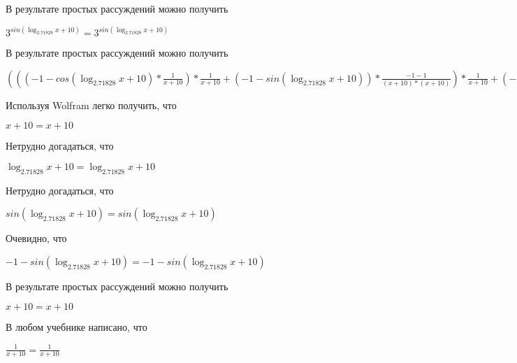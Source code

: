 \documentclass[12pt,a4paper,fleqn]{article}
\theoremstyle{definition}
\begin{document}
В результате простых рассуждений можно получить

${ 3 }^{sin(\log_{ 2.71828 }{ x  +  10 })} = { 3 }^{sin(\log_{ 2.71828 }{ x  +  10 })}$

В результате простых рассуждений можно получить

$((( -1  - cos(\log_{ 2.71828 }{ x  +  10 }) * \frac{ 1 }{ x  +  10 }
) * \frac{ 1 }{ x  +  10 }
 + ( -1  - sin(\log_{ 2.71828 }{ x  +  10 })) * \frac{ -1  -  1 }{( x  +  10 ) * ( x  +  10 )}
) * \frac{ 1 }{ x  +  10 }
 + ( -1  - sin(\log_{ 2.71828 }{ x  +  10 })) * \frac{ 1 }{ x  +  10 }
 * \frac{ -1  -  1 }{( x  +  10 ) * ( x  +  10 )}
 + ( -1  - sin(\log_{ 2.71828 }{ x  +  10 })) * \frac{ 1 }{ x  +  10 }
 * \frac{ -2 }{( x  +  10 ) * ( x  +  10 )}
 + cos(\log_{ 2.71828 }{ x  +  10 }) * \frac{ -1  -  -2  * ( x  +  10  +  x  +  10 )}{( x  +  10 ) * ( x  +  10 ) * ( x  +  10 ) * ( x  +  10 )}
) * { 3 }^{sin(\log_{ 2.71828 }{ x  +  10 })} = ((( -1  - cos(\log_{ 2.71828 }{ x  +  10 }) * \frac{ 1 }{ x  +  10 }
) * \frac{ 1 }{ x  +  10 }
 + ( -1  - sin(\log_{ 2.71828 }{ x  +  10 })) * \frac{ -1  -  1 }{( x  +  10 ) * ( x  +  10 )}
) * \frac{ 1 }{ x  +  10 }
 + ( -1  - sin(\log_{ 2.71828 }{ x  +  10 })) * \frac{ 1 }{ x  +  10 }
 * \frac{ -1  -  1 }{( x  +  10 ) * ( x  +  10 )}
 + ( -1  - sin(\log_{ 2.71828 }{ x  +  10 })) * \frac{ 1 }{ x  +  10 }
 * \frac{ -2 }{( x  +  10 ) * ( x  +  10 )}
 + cos(\log_{ 2.71828 }{ x  +  10 }) * \frac{ -1  -  -2  * ( x  +  10  +  x  +  10 )}{( x  +  10 ) * ( x  +  10 ) * ( x  +  10 ) * ( x  +  10 )}
) * { 3 }^{sin(\log_{ 2.71828 }{ x  +  10 })}$

Используя Wolfram легко получить, что

$ x  +  10  =  x  +  10 $

Нетрудно догадаться, что

$\log_{ 2.71828 }{ x  +  10 } = \log_{ 2.71828 }{ x  +  10 }$

Нетрудно догадаться, что

$sin(\log_{ 2.71828 }{ x  +  10 }) = sin(\log_{ 2.71828 }{ x  +  10 })$

Очевидно, что

$ -1  - sin(\log_{ 2.71828 }{ x  +  10 }) =  -1  - sin(\log_{ 2.71828 }{ x  +  10 })$

В результате простых рассуждений можно получить

$ x  +  10  =  x  +  10 $

В любом учебнике написано, что

$\frac{ 1 }{ x  +  10 }
 = \frac{ 1 }{ x  +  10 }
$
\end{document}
